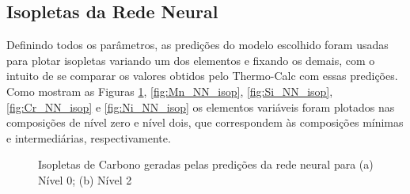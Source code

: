 \documentclass[brazil,tf,epusp]{usp}  %
\begin{document}
\subsection{Isopletas da Rede Neural}

Definindo todos os parâmetros, as predições do modelo escolhido foram usadas para plotar isopletas variando um dos elementos e fixando os demais, com o intuito de se comparar os valores obtidos pelo Thermo-Calc\textregistered{} com essas predições. Como mostram as Figuras \ref{fig:C_NN_isop}, \ref{fig:Mn_NN_isop}, \ref{fig:Si_NN_isop}, \ref{fig:Cr_NN_isop} e \ref{fig:Ni_NN_isop} os elementos variáveis foram plotados nas composições de nível zero e nível dois, que correspondem às composições mínimas e intermediárias, respectivamente.

\begin{figure}
\caption{Isopletas de Carbono geradas pelas predições da rede neural para (a) Nível 0; (b) Nível 2 }
\label{fig:C_NN_isop}
\end{figure}
\end{document}

